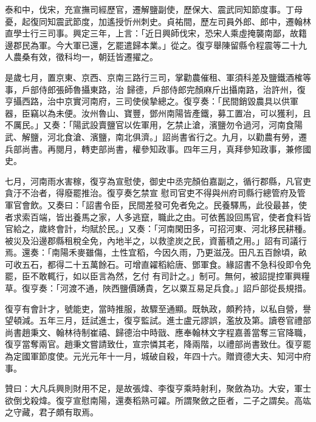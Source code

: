 \begin{pinyinscope}
 泰和中，伐宋，充宣撫司經歷官，遷解鹽副使，歷保大、震武同知節度事。丁母憂，起復同知震武節度，加遙授忻州刺史。貞祐間，歷左司員外郎、郎中，遷翰林直學士行三司事。興定三年，上言：「近日興師伐宋，恐宋人乘虛掩襲南鄙，故籍邊郡民為軍。今大軍已還，乞罷遣歸本業。」從之。復亨舉陳留縣令程震等二十九人農桑有效，徵科均一，朝廷皆遷擢之。



 是歲七月，置京東、京西、京南三路行三司，掌勸農催租、軍須科差及鹽鐵酒榷等事，戶部侍郎張師魯攝東路，治
 歸德，戶部侍郎完顏麻斤出攝南路，治許州，復亨攝西路，治中京實河南府，三司使侯摯總之。復亨奏：「民間銷毀農具以供軍器，臣竊以為未便。汝州魯山、寶豐，鄧州南陽皆產鐵，募工置冶，可以獲利，且不厲民。」又奏：「陽武設賣鹽官以佐軍用，乞禁止滄，濱鹽勿令過河，河南食陽武、解鹽，河北食滄、濱鹽，南北俱濟。」詔尚書省行之。九月，以勸農有勞，遷兵部尚書。再閱月，轉吏部尚書，權參知政事。四年三月，真拜參知政事，兼修國史。



 七月，河南雨水害稼，復亨為宣慰使，御史中丞完顏伯嘉副之，循行郡縣，凡官吏貪汙不治者，得廢罷推治。復亨奏乞禁宣
 慰司官吏不得與州府司縣行總管府及管軍官會飲。又奏曰：「詔書令臣，民間差發可免者免之。民養驛馬，此役最甚，使者求索百端，皆出養馬之家，人多逃竄，職此之由。可依舊設回馬官，使者食料皆官給之，歲終會計，均賦於民。」又奏：「河南閑田多，可招河東、河北移民耕種。被災及沿邊郡縣租稅全免，內地半之，以救塗炭之民，資蓄積之用。」詔有司議行焉。還奏：「南陽禾麥雖傷，土性宜稻，今因久雨，乃更滋茂。田凡五百餘頃，畝可收五石，都得二十五萬餘石。可增直糴稻給唐、鄧軍食。緣詔書不急科役即令免罷，臣不敢輒行，如以臣言為然，乞付
 有司計之。」制可。無何，被詔提控軍興糧草。復亨奏：「河渡不通，陜西鹽價踴貴，乞以粟互易足兵食。」詔戶部從長規措。



 復亨有會計才，號能吏，當時推服，故驟至通顯。既執政，頗矜持，以私自營，譽望頓減。五年三月，廷試進士，復亨監試。進士盧元謬誤，濫放及第。讀卷官禮部尚書趙秉文、翰林待制崔禧、歸德治中時戩、應奉翰林文字程嘉善當奪三官降職，復亨當奪兩官。趙秉文嘗請致仕，宣宗憐其老，降兩階，以禮部尚書致仕。復亨罷為定國軍節度使。元光元年十一月，城破自殺，年四十六。贈資德大夫、知河中府事。



 贊曰：大凡兵興則財用不足，是故張煒、李復亨乘時射利，聚斂為功。大安，軍士欲倒戈殺煒。復亨宣慰南陽，還奏稻熟可糴。所謂聚斂之臣者，二子之謂矣。高竑之守藏，君子頗有取焉。



\end{pinyinscope}